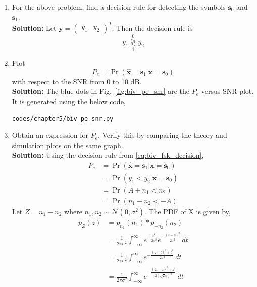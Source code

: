\documentclass[journal,10pt,twocolumn]{IEEEtran}
\newcommand\figref{Fig.~\ref}
\providecommand{\mbf}{\mathbf}
\providecommand{\pr}[1]{\ensuremath{\Pr\left(#1\right)}}
\newcommand{\solution}{\noindent \textbf{Solution: }}
\providecommand{\dec}[2]{\ensuremath{\overset{#1}{\underset{#2}{\gtrless}}}}
\newcommand{\myvec}[1]{\ensuremath{\begin{pmatrix}#1\end{pmatrix}}}
\providecommand{\gauss}[2]{\mathcal{N}\ensuremath{\left(#1,#2\right)}}
\begin{document}
\begin{enumerate}
%
\item
For the above problem, find a decision rule for detecting the symbols $\mbf{s}_0 $ and $\mbf{s}_1$.\\
\solution Let $\mbf{y} = \myvec{y_1&y_2}^T$. Then the decision rule is
\begin{equation}
	y_1 \dec{0}{1} y_2
	\label{eq:biv_fsk_decision}
\end{equation}
%
\item
Plot 
\begin{equation} 
P_e = \pr{\hat{\mbf{x}} = \mbf{s}_1|\mbf{x} = \mbf{s}_0}
\label{eq:prob_error_fsk}
\end{equation}
with respect to the SNR from 0 to 10 dB.\\
\solution The blue dots in \figref{fig:biv_pe_snr} are the $P_e$ versus SNR plot. It is generated using the below code,
\begin{lstlisting}
codes/chapter5/biv_pe_snr.py
\end{lstlisting}
%
\item
Obtain an expression for $P_e$. Verify this by comparing the theory and simulation plots on the same graph.\\
\solution Using the decision rule from \eqref{eq:biv_fsk_decision},
\begin{align}
	\nonumber
	P_e &= \pr{\hat{\mbf{x}} = \mbf{s}_1|\mbf{x} = \mbf{s}_0}\\\nonumber
	&= \pr{y_1 < y_2|\mbf{x} = \mbf{s}_0}\\\nonumber
	&= \pr{A+n_1 < n_2}\\
	\label{eq:prob_error_fsk_inter}
	&= \pr{n_1-n_2 < -A}
\end{align}
Let $Z = n_1-n_2$ where $n_1, n_2 \sim \gauss{0}{\sigma^2}$. The PDF of X is given by,
\begin{align}
	\nonumber
	p_Z(z) &= p_{n_1}(n_1) \ast p_{-n_2}(n_2)\\\nonumber
	&= \frac{1}{2\pi\sigma^2}\int_{-\infty}^{\infty} e^{-\frac{t^2}{2\sigma^2}}e^{-\frac{(t-z)^2}{2\sigma^2}}  \,dt\\\nonumber
	&= \frac{1}{2\pi\sigma^2}\int_{-\infty}^{\infty} e^{-\frac{(z-t)^2+t^2}{2\sigma^2}}  \,dt\\\nonumber
	&= \frac{1}{2\pi\sigma^2}\int_{-\infty}^{\infty} e^{-\frac{(2t-z)^2+z^2}{2(\sqrt{2}\sigma)^2}}  \,dt\\\nonumber

\end{align}
\end{enumerate}
\end{document}
